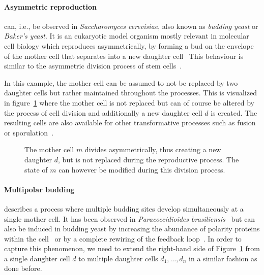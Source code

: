
\paragraph{Asymmetric reproduction} can, i.e., be observed in \textit{Saccharomyces cerevisiae},
also known as \textit{budding yeast} or \textit{Baker's yeast}.
It is an eukaryotic model organism mostly relevant in molecular cell biology which reproduces
asymmetrically, by forming a bud on the envelope of the mother cell that separates into a new
daughter cell~\cite{Feldmann2010}
This behaviour is similar to the asymmetric division process of stem cells~\cite{BhavsarJog2017}.

In this example, the mother cell can be assumed to not be replaced by two daughter cells but rather
maintained throughout the processes.
This is visualized in figure~\ref{fig:theory-asymmetric-reproduction} where the mother cell is not
replaced but can of course be altered by the process of cell division and additionally a new
daughter cell $d$ is created.
The resulting cells are also available for other transformative processes such as
fusion~\cite{Merlini2013} or sporulation~\cite{Neiman2005}.

\begin{figure}[ht]
    \centering
    \caption[Asymmetric cellular reproduction]{
        The mother cell $m$ divides asymmetrically, thus creating a new daughter $d$, but is not
        replaced during the reproductive process.
        The state of $m$ can however be modified during this division process.
    }
    \label{fig:theory-asymmetric-reproduction}
\end{figure}

\paragraph{Multipolar budding} describes a process where multiple budding sites develop
simultaneously at a single mother cell.
It has been observed in \textit{Paracoccidioides brasiliensis}~\cite{Almeida2009,Carbonell1967}
but can also be induced in budding yeast by increasing the abundance of polarity proteins within the
cell~\cite{Chiou2021} or by a complete rewiring of the feedback loop~\cite{Howell2009}.
In order to capture this phenomenon, we need to extend the right-hand side of
Figure~\ref{fig:theory-asymmetric-reproduction} from a single daughter cell $d$ to multiple daughter
cells $d_1,\dots,d_n$ in a similar fashion as done before.


